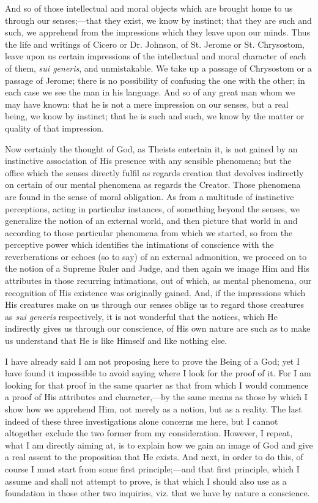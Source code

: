 And so of those intellectual and moral objects which are brought
home to us through our senses;—that they exist, we know by instinct;
that they are such and such, we apprehend from the impressions which
they leave upon our minds. Thus the life and writings of Cicero or Dr.
Johnson, of St. Jerome or St. Chrysostom, leave upon us certain
impressions of the intellectual and moral character of each of them, \emph{sui
generis}, and unmistakable. We take up a passage of Chrysostom or a
passage of Jerome; there is no possibility of confusing the one with
the other; in each case we see the man in his language. And so of any
great man whom we may have known: that he is not a mere impression on
our senses, but a real being, we know by instinct; that he is such and
such, we know by the matter or quality of that impression.

Now certainly the thought of God, as Theists entertain it, is not
gained by an instinctive association of His presence with any
sensible phenomena; but the office which the senses directly fulfil as
regards creation that devolves indirectly on certain of our mental
phenomena as regards the Creator. Those phenomena are found in the
sense of moral obligation. As from a multitude of instinctive
perceptions, acting in particular instances, of something beyond the
senses, we generalize the notion of an external world, and then
picture that world in and according to those particular phenomena from
which we started, so from the perceptive power which identifies the
intimations of conscience with the reverberations or echoes (so to
say) of an external admonition, we proceed on to the notion of a
Supreme Ruler and Judge, and then again we image Him and His
attributes in those recurring intimations, out of which, as mental
phenomena, our recognition of His existence was originally gained.
And, if the impressions which His creatures make on us through our
senses oblige us to regard those creatures as \emph{sui generis}
respectively, it is not wonderful that the notices, which He
indirectly gives us through our conscience, of His own nature are such
as to make us understand that He is like Himself and like nothing
else.

I have already said I am not proposing here to prove the Being of a
God; yet I have found it impossible to avoid saying where I look for
the proof of it. For I am looking for that proof in the same quarter
as that from which I would commence a proof of His attributes and
character,—by the same means as those by which I show how we
apprehend Him, not merely as a notion, but as a reality. The last
indeed of these three investigations alone concerns me here, but
I cannot altogether exclude the two former from my consideration.
However, I repeat, what I am directly aiming at, is to explain how we
gain an image of God and give a real assent to the proposition that He
exists. And next, in order to do this, of course I must start from
some first principle;—and that first principle, which I assume and
shall not attempt to prove, is that which I should also use as a
foundation in those other two inquiries, viz. that we have by nature a
conscience.


